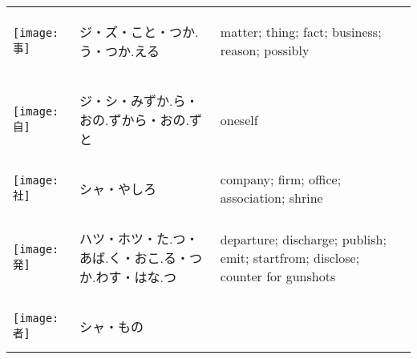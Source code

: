 \documentclass[a4paper,12pt]{extarticle}
\begin{document}
\begin{longtable}{|lp{6cm}p{4cm}|}
\begin{minipage}{0.3\textwidth}
\centerline{
	\texttt{[image: 事]}
}
\end{minipage}
&
\begin{CJK}{UTF8}{min}ジ・ズ・こと・つか.う・つか.える\end{CJK}
&
matter; thing; fact; business; reason; possibly
\\ 
\begin{minipage}{0.3\textwidth}
\centerline{
	\texttt{[image: 自]}
}
\end{minipage}
&
\begin{CJK}{UTF8}{min}ジ・シ・みずか.ら・おの.ずから・おの.ずと\end{CJK}
&
oneself
\\ 
\begin{minipage}{0.3\textwidth}
\centerline{
	\texttt{[image: 社]}
}
\end{minipage}
&
\begin{CJK}{UTF8}{min}シャ・やしろ\end{CJK}
&
company; firm; office; association; shrine
\\ 
\begin{minipage}{0.3\textwidth}
\centerline{
	\texttt{[image: 発]}
}
\end{minipage}
&
\begin{CJK}{UTF8}{min}ハツ・ホツ・た.つ・あば.く・おこ.る・つか.わす・はな.つ\end{CJK}
&
departure; discharge; publish; emit; startfrom; disclose; counter for gunshots
\\ 
\begin{minipage}{0.3\textwidth}
\centerline{
	\texttt{[image: 者]}
}
\end{minipage}
&
\begin{CJK}{UTF8}{min}シャ・もの\end{CJK}

\end{longtable}
\end{document}
